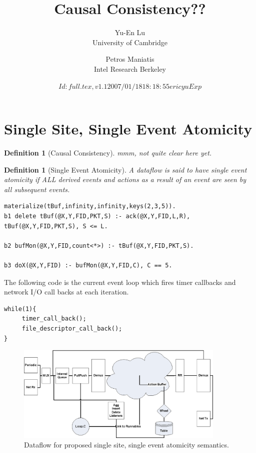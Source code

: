 \documentclass{article}
\title{Causal Consistency??}
\author{Yu-En Lu \\University of Cambridge \and Petros Maniatis \\Intel Research Berkeley}
\date{$Id: full.tex,v 1.1 2007/01/18 18:18:55 ericyu Exp $}
\newtheorem{definition}[theorem]{Definition}
\begin{document}
\maketitle

\section{Single Site, Single Event Atomicity}
\begin{definition}[Causal Consistency]
	mmm, not quite clear here yet.
\end{definition}

\begin{definition}[Single Event Atomicity]
	A dataflow is said to have single event atomicity if
	ALL derived events and actions as a result of an event 
	are seen by all subsequent events.
\end{definition}

\begin{verbatim}
materialize(tBuf,infinity,infinity,keys(2,3,5)).
b1 delete tBuf(@X,Y,FID,PKT,S) :- ack(@X,Y,FID,L,R), tBuf(@X,Y,FID,PKT,S), S <= L.

b2 bufMon(@X,Y,FID,count<*>) :- tBuf(@X,Y,FID,PKT,S).

b3 doX(@X,Y,FID) :- bufMon(@X,Y,FID,C), C == 5.
\end{verbatim}

The following code is the current event loop which fires timer callbacks and network I/O call backs
at each iteration.
\begin{verbatim}
while(1){
     timer_call_back();
     file_descriptor_call_back();
}
\end{verbatim}


\begin{figure}[h]
	\includegraphics[width=10cm]{SSSingleEventAtomicityDF.eps}
	\caption{Dataflow for proposed single site, single event atomicity semantics.}
	\label{fig:SSSingleEventAtomicityDF}
\end{figure}
\end{document}
